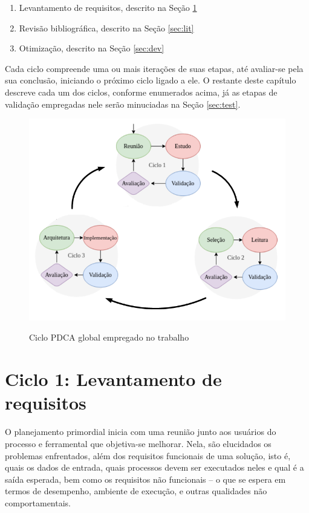 \documentclass[cic,tc]{iiufrgs}
\begin{document}
\begin{enumerate}
    \item Levantamento de requisitos, descrito na Seção \ref{sec:plan}
    \item Revisão bibliográfica, descrito na Seção \ref{sec:lit}
    \item Otimização, descrito na Seção \ref{sec:dev}
\end{enumerate}

Cada ciclo compreende uma ou mais iterações de suas etapas, até avaliar-se pela
sua conclusão, iniciando o próximo ciclo ligado a ele. O restante deste
capítulo descreve cada um dos ciclos, conforme enumerados acima, já as etapas
de validação empregadas nele serão minuciadas na Seção \ref{sec:test}.

\begin{figure}[H] \caption{Ciclo PDCA global empregado no trabalho} \begin{center}
\includegraphics[width=0.85\linewidth]{img/pdca_global.png} \end{center}
 \label{fig:pdca_global} \end{figure}

\section{Ciclo 1: Levantamento de requisitos}
\label{sec:plan}

O planejamento primordial inicia com uma reunião junto aos usuários do processo
e ferramental que objetiva-se melhorar. Nela, são elucidados os problemas
enfrentados, além dos requisitos funcionais de uma solução, isto é, quais os
dados de entrada, quais processos devem ser executados neles e qual é a saída
esperada, bem como os requisitos não funcionais -- o que se espera em termos de
desempenho, ambiente de execução, e outras qualidades não comportamentais. 
\end{document}
